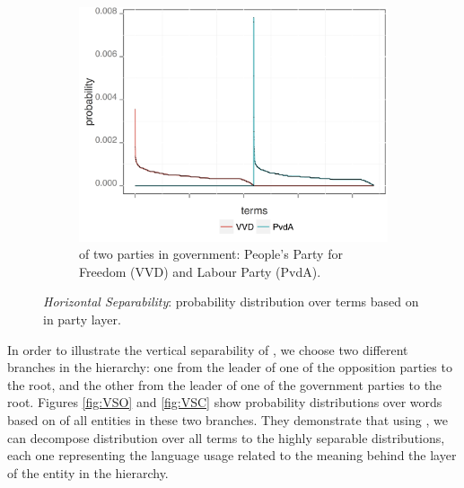 \begin{figure}[!t]
\begin{subfigure}[b]{0.32\textwidth}
        \end{subfigure}
        ~ 
        \begin{subfigure}[b]{0.32\textwidth}
\centering
\includegraphics[width=\linewidth]{02-part-01/chapter-03/figs_and_tables/img_VVD-PvdA.png}
\caption{\label{fig:HSPCC} \achswlm of two parties in government: People's Party for Freedom (VVD) and Labour Party (PvdA).}
        \end{subfigure}
        \caption{\label{fig:HSP-pairs} \emph{Horizontal Separability}: probability distribution over terms based on \hswlms in party layer.}
\end{figure}

In order to illustrate the vertical separability of \achswlm, we choose two different branches in the hierarchy: one from the leader of one of the opposition parties to the root, and the other from the leader of one of the government parties to the root. Figures \ref{fig:VSO} and \ref{fig:VSC} show probability distributions over words based on \achswlm of all entities in these two branches. They demonstrate that using \achswlm, we can decompose distribution over all terms to the highly separable distributions, each one representing the language usage related to the meaning behind the layer of the entity in the hierarchy. 

